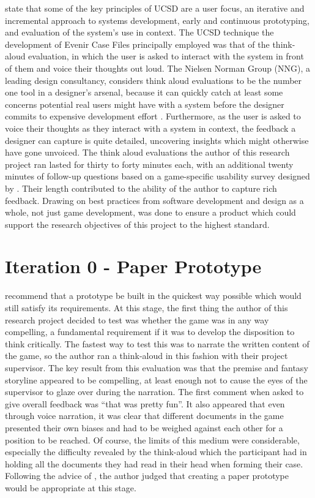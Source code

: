 \documentclass{l4proj}
\begin{document}
\citet{gulliksen2003key} state that some of the key principles of UCSD are a user focus, an iterative and incremental approach to systems development, early and continuous prototyping, and evaluation of the system’s use in context. The UCSD technique the development of Evenir Case Files principally employed was that of the think-aloud evaluation, in which the user is asked to interact with the system in front of them and voice their thoughts out loud. The Nielsen Norman Group (NNG), a leading design consultancy, considers think aloud evaluations to be the number one tool in a designer’s arsenal, because it can quickly catch at least some concerns potential real users might have with a system before the designer commits to expensive development effort \citep{nielsenthinkaloud}. Furthermore, as the user is asked to voice their thoughts as they interact with a system in context, the feedback a designer can capture is quite detailed, uncovering insights which might otherwise have gone unvoiced. The think aloud evaluations the author of this research project ran lasted for thirty to forty minutes each, with an additional twenty minutes of follow-up questions based on a game-specific usability survey designed by \citet{fullerton2004game}. Their length contributed to the ability of the author to capture rich feedback. Drawing on best practices from software development and design as a whole, not just game development, was done to ensure a product which could support the research objectives of this project to the highest standard. 

\section{Iteration 0 - Paper Prototype}

\citet{fullerton2004game} recommend that a prototype be built in the quickest way possible which would still satisfy its requirements. At this stage, the first thing the author of this research project decided to test was whether the game was in any way compelling, a fundamental requirement if it was to develop the disposition to think critically. The fastest way to test this was to narrate the written content of the game, so the author ran a think-aloud in this fashion with their project supervisor. The key result from this evaluation was that the premise and fantasy storyline appeared to be compelling, at least enough not to cause the eyes of the supervisor to glaze over during the narration. The first comment when asked to give overall feedback was “that was pretty fun”. It also appeared that even through voice narration, it was clear that different documents in the game presented their own biases and had to be weighed against each other for a position to be reached. Of course, the limits of this medium were considerable, especially the difficulty revealed by the think-aloud which the participant had in holding all the documents they had read in their head when forming their case. Following the advice of \citet{fullerton2004game}, the author judged that creating a paper prototype would be appropriate at this stage. 
\end{document}
